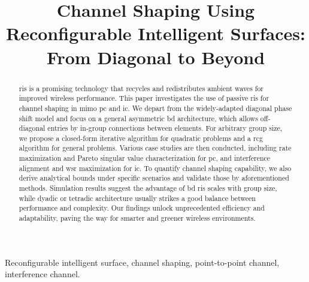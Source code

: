 \documentclass[journal]{IEEEtran}
\begin{document}
\title{Channel Shaping Using Reconfigurable Intelligent Surfaces: From Diagonal to Beyond}
\author{
}
\maketitle

\begin{abstract}
	\gls{ris} is a promising technology that recycles and redistributes ambient waves for improved wireless performance.
	This paper investigates the use of passive \gls{ris} for channel shaping in \gls{mimo} \gls{pc} and \gls{ic}.
	We depart from the widely-adapted diagonal phase shift model and focus on a general asymmetric \gls{bd} architecture, which allows off-diagonal entries by in-group connections between elements.
	For arbitrary group size, we propose a closed-form iterative algorithm for quadratic problems and a \gls{rcg} algorithm for general problems.
	Various case studies are then conducted, including rate maximization and Pareto singular value characterization for \gls{pc}, and interference alignment and \gls{wsr} maximization for \gls{ic}.
	To quantify channel shaping capability, we also derive analytical bounds under specific scenarios and validate those by aforementioned methods.
	Simulation results suggest the advantage of \gls{bd} \gls{ris} scales with group size, while dyadic or tetradic architecture usually strikes a good balance between performance and complexity.
	Our findings unlock unprecedented efficiency and adaptability, paving the way for smarter and greener wireless environments.
\end{abstract}

\begin{IEEEkeywords}
	Reconfigurable intelligent surface, channel shaping, point-to-point channel, interference channel.
\end{IEEEkeywords}
\end{document}
